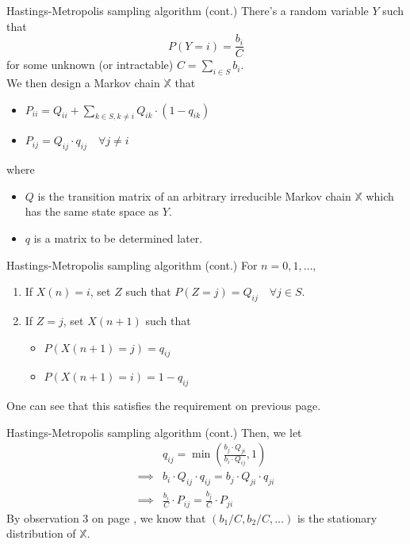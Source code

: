 \documentclass[mathserif]{beamer}
\begin{document}
\begin{frame}{Hastings-Metropolis sampling algorithm (cont.)}\label{possible_Y}
There's a random variable $Y$ such that
\[
P(Y=i) = \frac{b_i}{C}
\]
for some unknown (or intractable) $C = \sum_{i\in S}b_i$.\\
We then design a Markov chain $\mathbb{X}$ that
\begin{itemize}
\item $P_{ii} = Q_{ii} + \sum_{k\in S, k\neq i} Q_{ik}\cdot (1-q_{ik})$
\item $P_{ij} = Q_{ij}\cdot q_{ij} \quad\forall j\neq i$
\end{itemize}
where
\begin{itemize}
\item $Q$ is the transition matrix of an arbitrary irreducible Markov chain $\mathbb{X}$ which has the same state space as $Y$.
\item $q$ is a matrix to be determined later.
\end{itemize}
\end{frame}

\begin{frame}{Hastings-Metropolis sampling algorithm (cont.)}
For $n = 0,1,\ldots$,
\begin{enumerate}
\item If $X(n)=i$, set $Z$ such that $P(Z = j) = Q_{ij} \quad\forall j\in S$.
\item If $Z = j$, set $X(n+1)$ such that
	\begin{itemize}
	\item $P(X(n+1)=j) = q_{ij}$
	\item $P(X(n+1)=i) = 1 - q_{ij}$
	\end{itemize}
\end{enumerate}
One can see that this satisfies the requirement on previous page.
\end{frame}

\begin{frame}{Hastings-Metropolis sampling algorithm (cont.)}
Then, we let
\begin{align*}
& q_{ij} = \min\left( \frac{b_j\cdot Q_{ji}}{b_i\cdot Q_{ij}}, 1 \right) \\
\implies & b_i\cdot Q_{ij}\cdot q_{ij} = b_j\cdot Q_{ji}\cdot q_{ji} \\
\implies & \frac{b_i}{C}\cdot P_{ij} = \frac{b_j}{C}\cdot P_{ji}
\end{align*}
By observation 3 on page \pageref{obs3}, we know that $(b_1/C, b_2/C,\ldots)$ is the stationary distribution of $\mathbb{X}$.
\end{frame}
\end{document}
